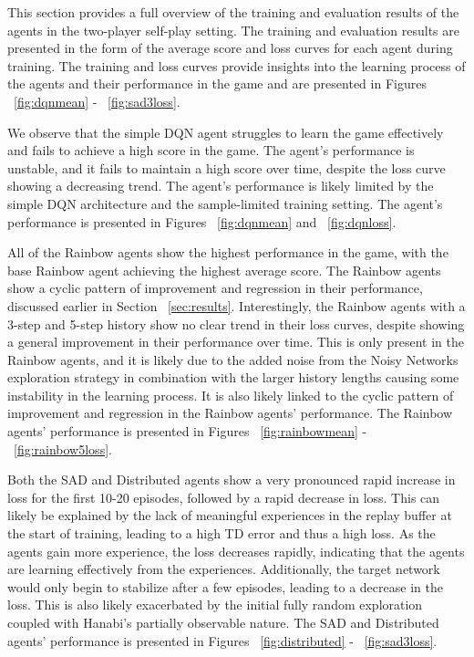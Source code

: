 This section provides a full overview of the training and evaluation results of the agents in the two-player self-play setting. The training and evaluation results are presented in the form of the average score and loss curves for each agent during training. The training and loss curves provide insights into the learning process of the agents and their performance in the game and are presented in Figures ~\ref{fig:dqnmean} - ~\ref{fig:sad3loss}.

We observe that the simple DQN agent struggles to learn the game effectively and fails to achieve a high score in the game. The agent's performance is unstable, and it fails to maintain a high score over time, despite the loss curve showing a decreasing trend. The agent's performance is likely limited by the simple DQN architecture and the sample-limited training setting. The agent's performance is presented in Figures ~\ref{fig:dqnmean} and ~\ref{fig:dqnloss}.

All of the Rainbow agents show the highest performance in the game, with the base Rainbow agent achieving the highest average score. The Rainbow agents show a cyclic pattern of improvement and regression in their performance, discussed earlier in Section ~\ref{sec:results}. Interestingly, the Rainbow agents with a 3-step and 5-step history show no clear trend in their loss curves, despite showing a general improvement in their performance over time. This is only present in the Rainbow agents, and it is likely due to the added noise from the Noisy Networks exploration strategy in combination with the larger history lengths causing some instability in the learning process. It is also likely linked to the cyclic pattern of improvement and regression in the Rainbow agents' performance. The Rainbow agents' performance is presented in Figures ~\ref{fig:rainbowmean} - ~\ref{fig:rainbow5loss}.

Both the SAD and Distributed agents show a very pronounced rapid increase in loss for the first 10-20 episodes, followed by a rapid decrease in loss. This can likely be explained by the lack of meaningful experiences in the replay buffer at the start of training, leading to a high TD error and thus a high loss. As the agents gain more experience, the loss decreases rapidly, indicating that the agents are learning effectively from the experiences. Additionally, the target network would only begin to stabilize after a few episodes, leading to a decrease in the loss. This is also likely exacerbated by the initial fully random exploration coupled with Hanabi's partially observable nature. The SAD and Distributed agents' performance is presented in Figures ~\ref{fig:distributed} - ~\ref{fig:sad3loss}.

